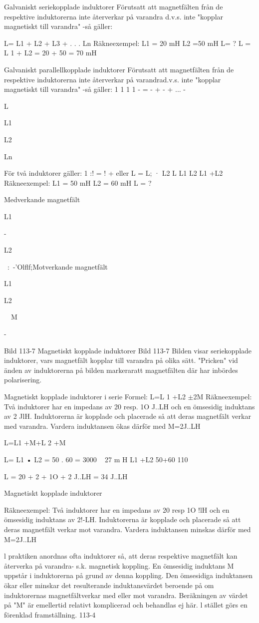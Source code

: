 Galvaniskt seriekopplade induktorer
Förutsatt att magnetfälten från de respektive
induktorerna inte återverkar på varandra d.v.s. inte "kopplar magnetiskt till varandra"
-så gäller:

L= L1 + L2 + L3 + . . . Ln
Räkneexempel:
L1 = 20 mH L2 =50 mH L= ?
L = L 1 + L2 = 20 + 50 = 70 mH

Galvaniskt parallellkopplade induktorer
Förutsatt att magnetfälten från de respektive
induktorerna inte återverkar på varandrad.v.s. inte "kopplar magnetiskt till varandra"
-så gäller:
1
1
1
1
- = - + - + ... -

L

L1

L2

Ln

För två induktorer gäller:
1
:! = ! + eller
L = L; · L2
L L1 L2
L1 +L2
Räkneexempel:
L1 = 50 mH L2 = 60 mH L = ?

Medverkande magnetfält

L1

-

L2

~:~-'Olflf;Motverkande magnetfält

L1

L2

~~M~

-

Bild 113-7 Magnetiskt kopplade induktorer
Bild 113-7
Bilden visar seriekopplade induktorer, vars
magnetfält kopplar till varandra på olika sätt.
"Pricken" vid änden av induktorerna på
bilden markeraratt magnetfälten där har inbördes polarisering.

Magnetiskt kopplade induktorer i serie
Formel:
L=L 1 +L2 \(\pm\)2M
Räkneexempel:
Två induktorer har en impedans av 20 resp.
1O J..LH och en ömsesidig induktans av 2 JlH.
Induktorerna är kopplade och placerade så
att deras magnetfält verkar med varandra.
Vardera induktansen ökas därför med
M=2J..LH

L=L1 +M+L 2 +M

L= L1 • L2 = 50 . 60 = 3000 ~ 27 m H
L1 +L2
50+60
110

L = 20 + 2 + 1O + 2 J..LH = 34 J..LH

Magnetiskt kopplade induktorer

Räkneexempel:
Två induktorer har en impedans av 20 resp
1O !lH och en ömsesidig induktans av 2!-LH.
Induktorerna är kopplade och placerade så
att deras magnetfält verkar mot varandra.
Vardera induktansen minskas därför med
M=2J..LH

l praktiken anordnas ofta induktorer så, att
deras respektive magnetfält kan återverka
på varandra- s.k. magnetisk koppling.
En ömsesidig induktans M uppstår i
induktorerna på grund av denna koppling.
Den ömsesidiga induktansen ökar eller minskar det resulterande induktansvärdet beroende på om induktorernas magnetfältverkar
med eller mot varandra.
Beräkningen av värdet på "M" är emellertid relativt komplicerad och behandlas ej här.
l stället görs en förenklad framställning.
113-4

